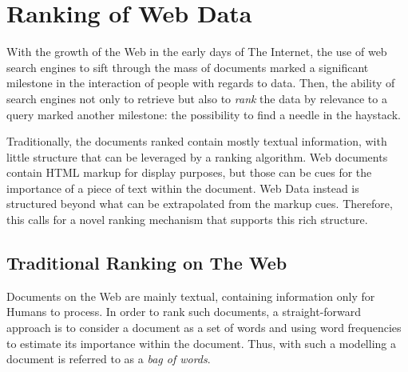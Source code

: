 %
%

\section{Ranking of Web Data}
\label{chap:introduction:ranking}

With the growth of the Web in the early days of The Internet, the use of web search engines to sift through the mass of documents marked a significant milestone in the interaction of people with regards to data. Then, the ability of search engines not only to retrieve but also to \emph{rank} the data by relevance to a query marked another milestone: the possibility to find a needle in the haystack.

Traditionally, the documents ranked contain mostly textual information, with little structure that can be leveraged by a ranking algorithm. Web documents contain HTML markup for display purposes, but those can be cues for the importance of a piece of text within the document. Web Data instead is structured beyond what can be extrapolated from the markup cues. Therefore, this calls for a novel ranking mechanism that supports this rich structure.

\subsection{Traditional Ranking on The Web}

Documents on the Web are mainly textual, containing information only for Humans to process. In order to rank such documents, a straight-forward approach is to consider a document as a set of words and using word frequencies to estimate its importance within the document. Thus, with such a modelling a document is referred to as a \emph{bag of words}.

